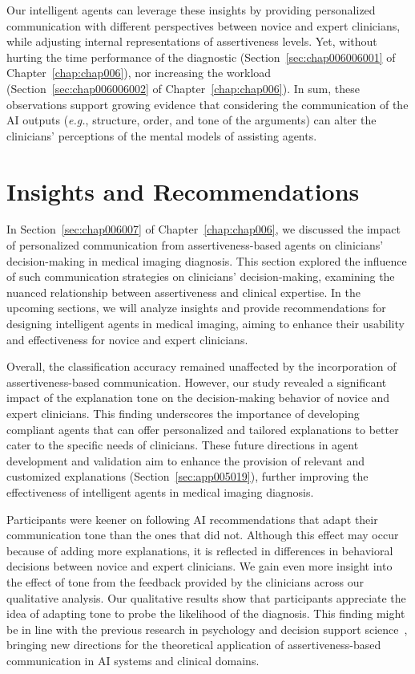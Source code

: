 \textcolor{revised}{Our intelligent agents can leverage these insights by providing personalized communication with different perspectives between novice and expert clinicians, while adjusting internal representations of assertiveness levels.}
Yet, without hurting the time performance of the diagnostic (Section~\ref{sec:chap006006001} of Chapter~\ref{chap:chap006}), nor increasing the workload (Section~\ref{sec:chap006006002} of Chapter~\ref{chap:chap006}).
In sum, these observations support growing evidence that considering the communication of the \ac{AI} outputs ({\it e.g.}, structure, order, and tone of the arguments) can alter the clinicians' perceptions of the mental models of assisting agents.

\section{Insights and Recommendations}
\label{sec:app005008}

\textcolor{revised}{In Section~\ref{sec:chap006007} of Chapter~\ref{chap:chap006}, we discussed the impact of personalized communication from assertiveness-based agents on clinicians' decision-making in medical imaging diagnosis.
This section explored the influence of such communication strategies on clinicians' decision-making, examining the nuanced relationship between assertiveness and clinical expertise.
In the upcoming sections, we will analyze insights and provide recommendations for designing intelligent agents in medical imaging, aiming to enhance their usability and effectiveness for novice and expert clinicians.}

Overall, the classification accuracy remained unaffected by the incorporation of assertiveness-based communication.
However, our study revealed a significant impact of the explanation tone on the decision-making behavior of novice and expert clinicians.
This finding underscores the importance of developing compliant agents that can offer personalized and tailored explanations to better cater to the specific needs of clinicians.
These future directions in agent development and validation aim to enhance the provision of relevant and customized explanations \textcolor{revised}{(Section~\ref{sec:app005019})}, further improving the effectiveness of intelligent agents in medical imaging diagnosis.

Participants were keener on following \ac{AI} recommendations that adapt their communication tone than the ones that did not.
Although this effect may occur because of adding more explanations, it is reflected in differences in behavioral decisions between novice and expert clinicians.
We gain even more insight into the effect of tone from the feedback provided by the clinicians across our qualitative analysis.
Our qualitative results show that participants appreciate the idea of adapting tone to probe the likelihood of the diagnosis.
This finding might be in line with the previous research in psychology and decision support science~\cite{Seidel2021}, bringing new directions for the theoretical application of assertiveness-based communication in \ac{AI} systems and clinical domains.

